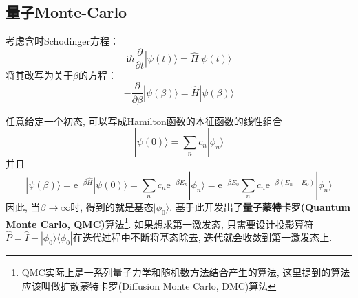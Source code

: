         \subsection{量子Monte-Carlo}

        考虑含时Schodinger方程：
        \begin{equation}
            \mathrm{i}\hbar \frac {\partial}{\partial t} | \psi(t) \rangle = \hat{H}|\psi(t) \rangle
        \end{equation}
        将其改写为关于$\beta$的方程：
        \begin{equation}
            -\frac {\partial}{\partial \beta} |\psi(\beta) \rangle = \hat{H} |\psi(\beta) \rangle
        \end{equation}

        任意给定一个初态, 可以写成Hamilton函数的本征函数的线性组合
        \begin{equation}
            |\psi(0) \rangle = \sum_n c_n |\phi_n\rangle
        \end{equation}
        并且
        \begin{equation}
            |\psi(\beta) \rangle = \mathrm{e}^{-\beta \hat{H}} |\psi(0) \rangle = \sum_n c_n\mathrm{e}^{-\beta E_n}|\phi_n \rangle = \mathrm{e}^{-\beta E_0} \sum_n c_n \mathrm{e}^{-\beta(E_n-E_0)} |\phi_n \rangle
        \end{equation}
        因此, 当$\beta \to \infty$时, 得到的就是基态$|\phi_0 \rangle$. 基于此开发出了\textbf{量子蒙特卡罗(Quantum Monte Carlo, QMC)}算法\footnote{QMC实际上是一系列量子力学和随机数方法结合产生的算法, 这里提到的算法应该叫做扩散蒙特卡罗(Diffusion Monte Carlo, DMC)算法}. 如果想求第一激发态, 只需要设计投影算符$\hat P = \hat I - |\phi_0 \rangle\langle \phi_0|$在迭代过程中不断将基态除去, 迭代就会收敛到第一激发态上. 

    
    